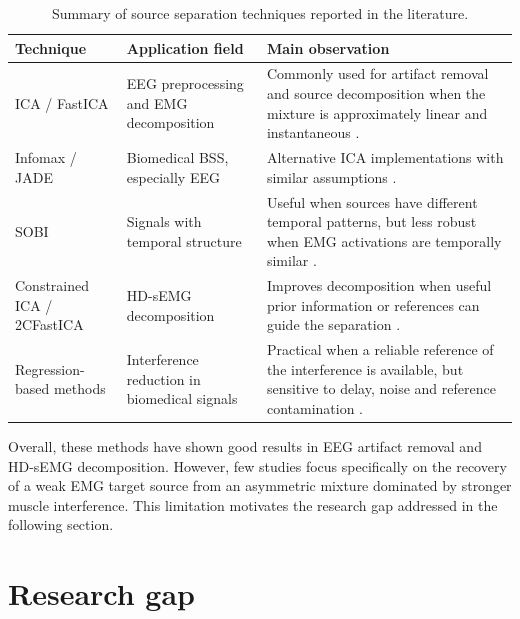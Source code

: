 \begin{table}[H]
\centering
\renewcommand{\arraystretch}{1.2}
\small
\begin{tabular}{p{3.2cm} p{4.2cm} p{5.2cm}}
\hline
\textbf{Technique} & \textbf{Application field} & \textbf{Main observation} \\
\hline

ICA / FastICA &
EEG preprocessing and EMG decomposition &
Commonly used for artifact removal and source decomposition when the mixture is approximately linear and instantaneous \cite{jung_extended_1998,naik_applications_2011}. \\

Infomax / JADE &
Biomedical BSS, especially EEG &
Alternative ICA implementations with similar assumptions \cite{kanna_advanced_2019}. \\

SOBI &
Signals with temporal structure &
Useful when sources have different temporal patterns, but less robust when EMG activations are temporally similar \cite{kalogiannis_reworked_2017}. \\

Constrained ICA / 2CFastICA &
HD-sEMG decomposition &
Improves decomposition when useful prior information or references can guide the separation \cite{chen_2cfastica_2024}. \\

Regression-based methods &
Interference reduction in biomedical signals &
Practical when a reliable reference of the interference is available, but sensitive to delay, noise and reference contamination \cite{gokcesu_adaptive_2019,jiang_removal_2019}. \\

\hline
\end{tabular}
\caption{Summary of source separation techniques reported in the literature.}
\label{tab:literature_techniques}
\end{table}

Overall, these methods have shown good results in EEG artifact removal and
HD-sEMG decomposition. However, few studies focus specifically on the recovery of
a weak EMG target source from an asymmetric mixture dominated by stronger muscle
interference. This limitation motivates the research gap addressed in the
following section.

\section{Research gap}


